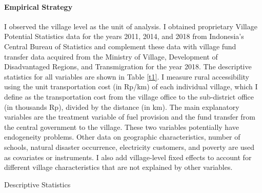 \documentclass[letterpaper,11pt,leqno]{article}
\newcommand{\bib}{bibliography.bib}
\begin{document}
\paragraph{Empirical Strategy} I observed the village level as the unit of analysis. I obtained proprietary Village Potential Statistics data for the years 2011, 2014, and 2018 from Indonesia's Central Bureau of Statistics and complement these data with village fund transfer data acquired from the Ministry of Village, Development of Disadvantaged Regions, and Transmigration for the year 2018. The descriptive statistics for all variables are shown in Table \ref{t1}. I measure rural accessibility using the unit transportation cost (in Rp/km) of each individual village, which I define as the transportation cost from the village office to the sub-district office (in thousands Rp), divided by the distance (in km). The main explanatory variables are the treatment variable of fuel provision and the fund transfer from the central government to the village. These two variables potentially have endogeneity problems.  Other  data on geographic characteristics, number of schools, natural disaster occurrence, electricity customers, and poverty are used as covariates or instruments. I also add village-level fixed effects to account for different village characteristics that are not explained by other variables.

\begin{table}[t]
\caption{Descriptive Statistics}
\label{t1}\end{table}



\end{document}
